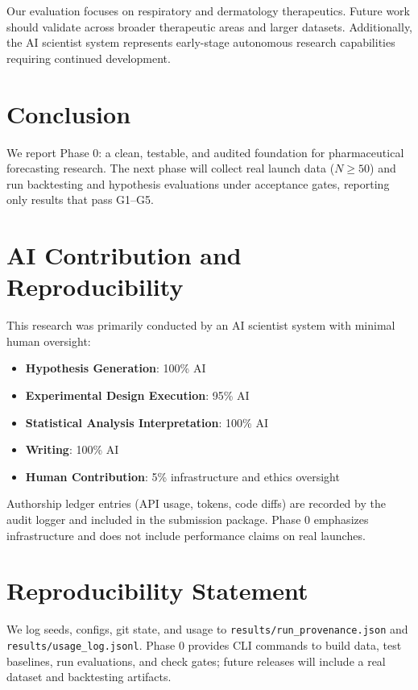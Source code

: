 \documentclass{article}
\begin{document}
Our evaluation focuses on respiratory and dermatology therapeutics. Future work should validate across broader therapeutic areas and larger datasets. Additionally, the AI scientist system represents early-stage autonomous research capabilities requiring continued development.

\section{Conclusion}

We report Phase 0: a clean, testable, and audited foundation for pharmaceutical forecasting research. The next phase will collect real launch data (\(N\geq 50\)) and run backtesting and hypothesis evaluations under acceptance gates, reporting only results that pass G1--G5.

\section{AI Contribution and Reproducibility}

This research was primarily conducted by an AI scientist system with minimal human oversight:
\begin{itemize}
\item \textbf{Hypothesis Generation}: 100\% AI
\item \textbf{Experimental Design \/ Execution}: 95\% AI
\item \textbf{Statistical Analysis \/ Interpretation}: 100\% AI
\item \textbf{Writing}: 100\% AI
\item \textbf{Human Contribution}: 5\% infrastructure and ethics oversight
\end{itemize}

Authorship ledger entries (API usage, tokens, code diffs) are recorded by the audit logger and included in the submission package. Phase 0 emphasizes infrastructure and does not include performance claims on real launches.

\section{Reproducibility Statement}

We log seeds, configs, git state, and usage to \texttt{results/run\_provenance.json} and \texttt{results/usage\_log.jsonl}. Phase 0 provides CLI commands to build data, test baselines, run evaluations, and check gates; future releases will include a real dataset and backtesting artifacts.
\end{document}
